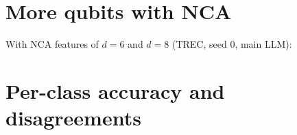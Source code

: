 \begin{table}[t]
\centering
\caption{Ablation without the LLM, seed 0, averaged over $d\in\{2,\dots,5\}$. Each row changes one part
of the full IQP selector. $\Delta$AUROC is the change in retrieval AUROC ($\times100$) with a 95\% paired
bootstrap interval; $J$ vs.\ full is the overlap with the sets the full method retrieves.}
\footnotesize

\end{table}

\section{More qubits with NCA}
With NCA features of $d=6$ and $d=8$ (TREC, seed 0, main LLM): \TNca

\section{Per-class accuracy and disagreements}
\TPerClass


